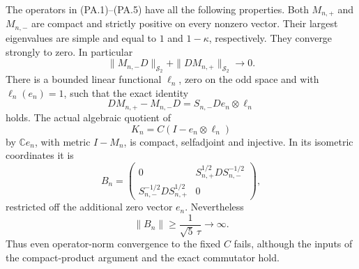 \begin{proposition}
\label{AC-S52}
The operators in (PA.1)--(PA.5) have all the following properties.
Both \(M_{n,+}\) and \(M_{n,-}\) are compact and strictly positive
on every nonzero vector.  Their largest eigenvalues are simple and
equal to \(1\) and \(1-\kappa\), respectively.  They converge
strongly to zero.  In particular
\[
 \|M_{n,-}D\|_{\mathcal S_2}
       +\|DM_{n,+}\|_{\mathcal S_2}\longrightarrow0.
 \tag{PA.6}
\]
There is a bounded linear functional \(\ell_n\), zero on the odd
space and with \(\ell_n(e_n)=1\), such that the exact identity
\[
 DM_{n,+}-M_{n,-}D
       =S_{n,-}De_n\otimes\ell_n
 \tag{PA.7}
\]
holds.  The actual algebraic quotient of
\[
 K_n=C(I-e_n\otimes\ell_n)
 \tag{PA.8}
\]
by \(\mathbb C e_n\), with metric \(I-M_n\), is compact,
selfadjoint and injective.  In its isometric coordinates it is
\[
 B_n=\begin{pmatrix}
 0&S_{n,+}^{1/2}D S_{n,-}^{-1/2}\\
 S_{n,-}^{-1/2}D S_{n,+}^{1/2}&0
 \end{pmatrix},
 \tag{PA.9}
\]
restricted off the additional zero vector \(e_n\).
Nevertheless
\[
       \|B_n\|\ge \frac1{\sqrt5\,\tau}
                    \longrightarrow\infty.
 \tag{PA.10}
\]
Thus even operator-norm convergence to the fixed \(C\) fails,
although the inputs of the compact-product argument and the exact
commutator hold.
\end{proposition}

